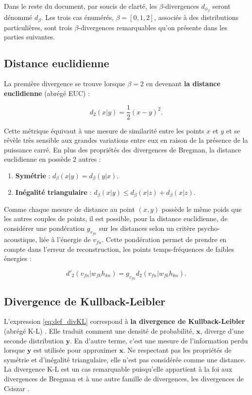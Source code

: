 Dans le reste du document, par soucis de clarté, les $\beta$-divergences $d_{\phi_{\beta}}$ seront dénommé $d_{\beta}$. Les trois cas énumérés, $\beta  = [0,1,2]$, associés à des distributions particulières, sont trois $\beta$-divergences remarquables qu'on présente dans les parties suivantes. 

\subsection{Distance euclidienne}
La première divergence se trouve lorsque $\beta = 2$ en devenant \textbf{la distance euclidienne} (abrégé EUC) : 

\begin{equation}
d_{{2}}(x\vert y) = \dfrac{1}{2}(x-y)^2.
\end{equation}

Cette métrique équivaut à une mesure de similarité entre les points $x$ et $y$ et se révèle très sensible aux grandes variations entre eux en raison de la présence de la puissance carré. En plus des propriétés des divergences de Bregman, la distance euclidienne en possède 2 autres : 
\begin{enumerate}

\item \textbf{Symétrie} : $d_{\beta}(x \vert y ) = d_{\beta}(y \vert x)$.

\item \textbf{Inégalité triangulaire} : $d_{\beta}(x \vert y ) \leq d_{\beta}(x \vert z ) + d_{\beta}(x \vert z )$.\\
\end{enumerate}

Comme chaque mesure de distance au point $(x,y)$ possède le même poids que les autres couples de points, il est possible, pour la distance euclidienne, de considérer une pondération $g_{v_{fn}}$  sur les distances selon un critère psycho-acoustique, liée à l'énergie de $v_{fn}$. Cette pondération permet de prendre en compte dans l'erreur de reconstruction, les points temps-fréquences de faibles énergies \cite{virtanen2004separation} : 

\begin{equation}
d'_2(v_{fn} \vert w_{fk} h_{kn}) = g_{v_{fn}} d_2 (v_{fn} \vert w_{fk} h_{kn}).
\end{equation}

\subsection{Divergence de Kullback-Leibler}
L'expression \ref{eq:def_divKL} correspond à \textbf{la divergence de Kullback-Leibler} (abrégé K-L) \cite{kompass_generalized_2007, cichocki_new_2006} . Elle traduit comment une densité de probabilité, $\mathbf{x}$, diverge d'une seconde distribution $\mathbf{y}$. En d'autre terme, c'est une mesure de l'information perdu lorsque $\mathbf{y}$ est utilisée pour approximer $\mathbf{x}$. Ne respectant pas les propriétés de symétrie et d'inégalité triangulaire, elle n'est pas considérée comme une distance. La divergence K-L est un cas remarquable puisqu'elle appartient à la foi aux divergences de Bregman et à une autre famille de divergences, les divergences de Csiszar \cite{cichocki_csiszars_2006}. 

